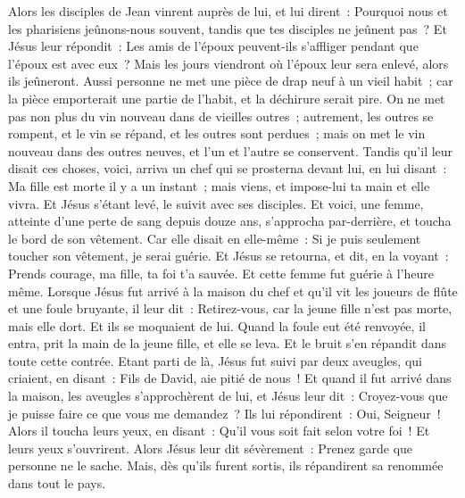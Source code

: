 \begin{multicols}{2}
Alors les disciples de Jean vinrent auprès de lui, et lui dirent~: Pourquoi nous et les pharisiens jeûnons-nous souvent, tandis que tes disciples ne jeûnent pas~?
Et Jésus leur répondit~: Les amis de l'époux peuvent-ils s'affliger pendant que l'époux est avec eux~? Mais les jours viendront où l'époux leur sera enlevé, alors ils jeûneront.
Aussi personne ne met une pièce de drap neuf à un vieil habit~; car la pièce emporterait une partie de l'habit, et la déchirure serait pire.
On ne met pas non plus du vin nouveau dans de vieilles outres~; autrement, les outres se rompent, et le vin se répand, et les outres sont perdues~; mais on met le vin nouveau dans des outres neuves, et l'un et l'autre se conservent.
Tandis qu'il leur disait ces choses, voici, arriva un chef qui se prosterna devant lui, en lui disant~: Ma fille est morte il y a un instant~; mais viens, et impose-lui ta main et elle vivra.
Et Jésus s'étant levé, le suivit avec ses disciples.
Et voici, une femme, atteinte d'une perte de sang depuis douze ans, s'approcha par-derrière, et toucha le bord de son vêtement.
Car elle disait en elle-même~: Si je puis seulement toucher son vêtement, je serai guérie.
Et Jésus se retourna, et dit, en la voyant~: Prends courage, ma fille, ta foi t'a sauvée. Et cette femme fut guérie à l'heure même.
Lorsque Jésus fut arrivé à la maison du chef et qu'il vit les joueurs de flûte et une foule bruyante,
il leur dit~: Retirez-vous, car la jeune fille n'est pas morte, mais elle dort. Et ils se moquaient de lui.
Quand la foule eut été renvoyée, il entra, prit la main de la jeune fille, et elle se leva.
Et le bruit s'en répandit dans toute cette contrée.
Etant parti de là, Jésus fut suivi par deux aveugles, qui criaient, en disant~: Fils de David, aie pitié de nous~!
Et quand il fut arrivé dans la maison, les aveugles s'approchèrent de lui, et Jésus leur dit~: Croyez-vous que je puisse faire ce que vous me demandez~? Ils lui répondirent~: Oui, Seigneur~!
Alors il toucha leurs yeux, en disant~: Qu'il vous soit fait selon votre foi~!
Et leurs yeux s'ouvrirent. Alors Jésus leur dit sévèrement~: Prenez garde que personne ne le sache.
Mais, dès qu'ils furent sortis, ils répandirent sa renommée dans tout le pays.

\end{multicols}
